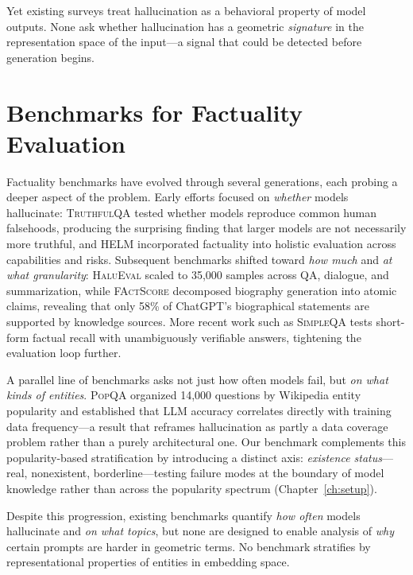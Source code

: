 Yet existing surveys treat hallucination as a behavioral property of model outputs.  None ask whether hallucination has a geometric \emph{signature} in the representation space of the input---a signal that could be detected before generation begins.


\section{Benchmarks for Factuality Evaluation}
\label{sec:lit-benchmarks}

Factuality benchmarks have evolved through several generations, each probing a deeper aspect of the problem.  Early efforts focused on \emph{whether} models hallucinate: \textsc{TruthfulQA} \citep{lin2022truthfulqa} tested whether models reproduce common human falsehoods, producing the surprising finding that larger models are not necessarily more truthful, and \textsc{HELM} \citep{liang2022helm} incorporated factuality into holistic evaluation across capabilities and risks.  Subsequent benchmarks shifted toward \emph{how much} and \emph{at what granularity}: \textsc{HaluEval} \citep{li2023halueval} scaled to 35,000 samples across QA, dialogue, and summarization, while \textsc{FActScore} \citep{min2023factscore} decomposed biography generation into atomic claims, revealing that only 58\% of ChatGPT's biographical statements are supported by knowledge sources.  More recent work such as \textsc{SimpleQA} \citep{wei2024simpleqa} tests short-form factual recall with unambiguously verifiable answers, tightening the evaluation loop further.

A parallel line of benchmarks asks not just how often models fail, but \emph{on what kinds of entities}.  \textsc{PopQA} \citep{mallen2023when} organized 14,000 questions by Wikipedia entity popularity and established that LLM accuracy correlates directly with training data frequency---a result that reframes hallucination as partly a data coverage problem rather than a purely architectural one.  Our benchmark complements this popularity-based stratification by introducing a distinct axis: \emph{existence status}---real, nonexistent, borderline---testing failure modes at the boundary of model knowledge rather than across the popularity spectrum (Chapter~\ref{ch:setup}).

Despite this progression, existing benchmarks quantify \emph{how often} models hallucinate and \emph{on what topics}, but none are designed to enable analysis of \emph{why} certain prompts are harder in geometric terms.  No benchmark stratifies by representational properties of entities in embedding space.


